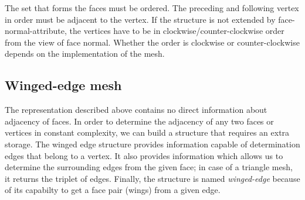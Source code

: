 The set that forms the faces must be ordered. The preceding and following vertex in order must be 
adjacent to
the vertex. If the structure is not extended by face-normal-attribute, the vertices have to be in 
clockwise/counter-clockwise order from the view of face normal. Whether the order is clockwise or counter-clockwise
depends on the implementation of the mesh.

\subsection{Winged-edge mesh}

The representation described above contains no direct information about adjacency of faces. 
In order to determine the adjacency of any two faces or vertices in constant complexity, we
can build a structure that requires an extra storage. The winged edge structure\cite{Baumgart1972}
provides information
capable of determination edges that belong to a vertex. It also provides information which allows us
to determine the surrounding edges from the given face;
in case of a triangle mesh, it returns the triplet of edges.
Finally, the structure is named \emph{winged-edge} because of its
capabilty to get a face pair (wings) from
a given edge.

